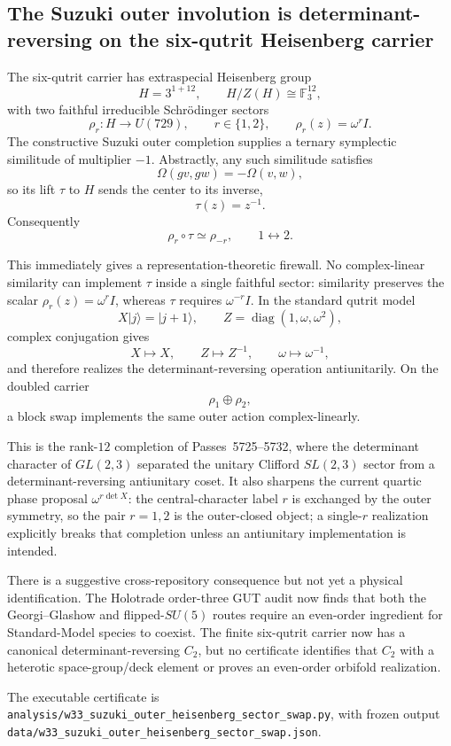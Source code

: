 \subsection{The Suzuki outer involution is determinant-reversing on the six-qutrit Heisenberg carrier}
\label{sec:20260917-suzuki-outer-heisenberg-sector-swap}

The six-qutrit carrier has extraspecial Heisenberg group
\[
 H=3^{1+12},\qquad H/Z(H)\cong\mathbb F_3^{12},
\]
with two faithful irreducible Schr\"odinger sectors
\[
 \rho_r: H\to U(729),\qquad r\in\{1,2\},
 \qquad \rho_r(z)=\omega^r I.
\]
The constructive Suzuki outer completion supplies a ternary symplectic
similitude of multiplier $-1$.  Abstractly, any such similitude satisfies
\[
 \Omega(gv,gw)=-\Omega(v,w),
\]
so its lift $\tau$ to $H$ sends the center to its inverse,
\[
 \boxed{\tau(z)=z^{-1}}.
\]
Consequently
\[
 \boxed{\rho_r\circ\tau\simeq\rho_{-r}},
 \qquad 1\leftrightarrow2.
\]

This immediately gives a representation-theoretic firewall.  No
complex-linear similarity can implement $\tau$ inside a single faithful sector:
similarity preserves the scalar $\rho_r(z)=\omega^rI$, whereas $\tau$ requires
$\omega^{-r}I$.  In the standard qutrit model
\[
 X|j\rangle=|j+1\rangle,
 \qquad Z=\operatorname{diag}(1,\omega,\omega^2),
\]
complex conjugation gives
\[
 X\mapsto X,\qquad Z\mapsto Z^{-1},\qquad
 \omega\mapsto\omega^{-1},
\]
and therefore realizes the determinant-reversing operation antiunitarily.
On the doubled carrier
\[
 \rho_1\oplus\rho_2,
\]
a block swap implements the same outer action complex-linearly.

This is the rank-$12$ completion of Passes~5725--5732, where the determinant
character of $GL(2,3)$ separated the unitary Clifford $SL(2,3)$ sector from a
determinant-reversing antiunitary coset.  It also sharpens the current quartic
phase proposal $\omega^{r\det X}$: the central-character label $r$ is exchanged
by the outer symmetry, so the pair $r=1,2$ is the outer-closed object; a
single-$r$ realization explicitly breaks that completion unless an antiunitary
implementation is intended.

There is a suggestive cross-repository consequence but not yet a physical
identification.  The Holotrade order-three GUT audit now finds that both the
Georgi--Glashow and flipped-$SU(5)$ routes require an even-order ingredient for
Standard-Model species to coexist.  The finite six-qutrit carrier now has a
canonical determinant-reversing $C_2$, but no certificate identifies that
$C_2$ with a heterotic space-group/deck element or proves an even-order
orbifold realization.

The executable certificate is
\texttt{analysis/w33\_suzuki\_outer\_heisenberg\_sector\_swap.py}, with frozen
output
\texttt{data/w33\_suzuki\_outer\_heisenberg\_sector\_swap.json}.
